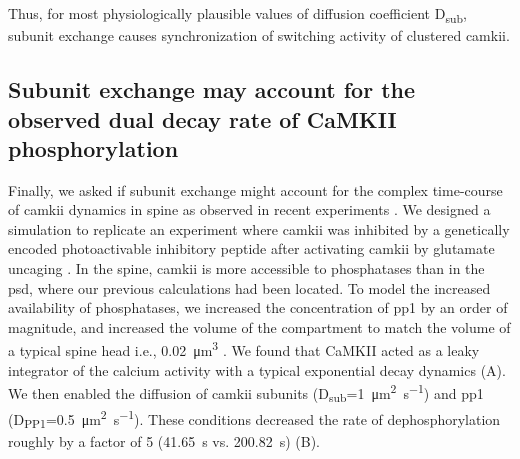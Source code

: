 \documentclass[9pt,lineno,doublespacing]{elife}
\newcommand\SUB[2]{#1\textsubscript{#2}}
\begin{document}
Thus, for most physiologically plausible values of diffusion coefficient
\SUB{D}{sub}, subunit exchange causes synchronization of switching activity of
clustered \gls{camkii}.

\subsection{Subunit exchange may account for the observed dual decay rate of
    CaMKII phosphorylation}\label{subsec:camkii_decay_two_time_course}

Finally, we asked if subunit exchange might account for the complex time-course
of \gls{camkii} dynamics in spine as observed in recent experiments
\citep{chang_camkii_2017}. We designed a simulation to replicate an experiment
where \gls{camkii} was inhibited by a genetically encoded photoactivable
inhibitory peptide after activating \gls{camkii} by glutamate uncaging
\citep{murakoshi_kinetics_2017}. In the spine, \gls{camkii} is more accessible
to phosphatases than in the \gls{psd}, where our previous calculations had been
located. To model the increased availability of phosphatases, we increased the
concentration of \gls{pp1} by an order of magnitude, and increased the volume of
the compartment to match the volume of a typical spine head i.e.,
\SI{0.02}{\cubic\micro\meter} \citep{bartol_nanoconnectomic_2015}. We found that
CaMKII acted as a leaky integrator of the calcium activity with a typical
exponential decay dynamics (A). We then enabled the
diffusion of \gls{camkii} subunits
(\SUB{D}{sub}=\SI{1}{\micro\meter\squared\per\second}) and \gls{pp1}
(\SUB{D}{PP1}=\SI{0.5}{\micro\meter\squared\per\second}). These conditions
decreased the rate of dephosphorylation roughly by a factor of 5
(\SI{41.65}{\second} vs. \SI{200.82}{\second}) (B). 
\end{document}
